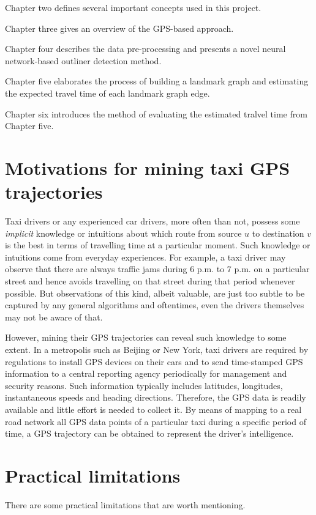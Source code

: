 Chapter two defines several important concepts used in this project. 

Chapter three gives an overview of the GPS-based approach.

Chapter four describes the data pre-processing and presents a novel neural network-based outliner detection method.

Chapter five elaborates the process of building a landmark graph and estimating the expected travel time of each landmark graph edge.

Chapter six introduces the method of evaluating the estimated tralvel time from Chapter five.

\section{Motivations for mining taxi GPS trajectories}
Taxi drivers or any experienced car drivers, more often than not, possess some \emph{implicit} knowledge or intuitions about which route from source $u$ to destination $v$ is the best in terms of travelling time at a particular moment. Such knowledge or intuitions come from everyday experiences. For example, a taxi driver may observe that there are always traffic jams during 6 p.m. to 7 p.m. on a particular street and hence avoids travelling on that street during that period whenever possible. But observations of this kind, albeit valuable, are just too subtle to be captured by any general algorithms and oftentimes, even the drivers themselves may not be aware of that.

However, mining their GPS trajectories can reveal such knowledge to some extent. In a metropolis such as Beijing or New York, taxi drivers are required by regulations to install GPS devices on their cars and to send time-stamped GPS information to a central reporting agency periodically for management and security reasons. Such information typically includes latitudes, longitudes, instantaneous speeds and heading directions. Therefore, the GPS data is readily available and little effort is needed to collect it. By means of mapping to a real road network all GPS data points of a particular taxi during a specific period of time, a GPS trajectory can be obtained to represent the driver's intelligence. 

\section{Practical limitations}
There are some practical limitations that are worth mentioning. 
